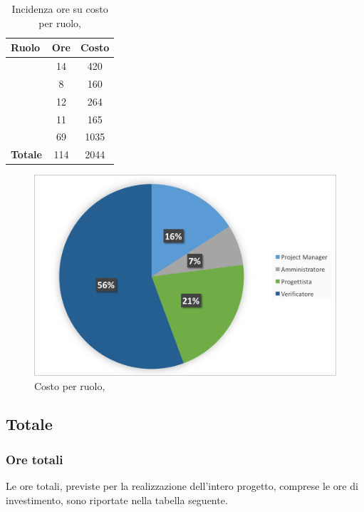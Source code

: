\begin{table}[h]
	\begin{center}
		\begin{tabular}{|l|c|c|}
			\hline
			\textbf{Ruolo}	& \textbf{Ore} &	\textbf{Costo}	 \\
			\hline
			\textit{\Pm}	&	14	&	420		\\
			\hline
			\textit{\Am}	&	8	&	160		\\
			\hline
			\textit{\Prog}	&	12	&	264	\\
			\hline
			\textit{\Progr}	&	11	&	165	\\
			\hline
			\textit{\Ver}	&	69	&	1035	\\
			\hline
			\textbf{Totale}	&	114	&	2044	\\
			\hline
		\end{tabular}
	\end{center}
	\caption{Incidenza ore su costo per ruolo, \VV}
\end{table}

\begin{figure}[H]
	\centering 
	\includegraphics[scale=0.7]{Immagini/GraficiTorteSezione6/VV.png}
	\caption{Costo per ruolo, \VV}
\end{figure}

\newpage
\subsection{Totale}
\subsubsection{Ore totali}
Le ore totali, previste per la realizzazione dell'intero progetto, comprese le ore di investimento, sono riportate nella tabella seguente.

